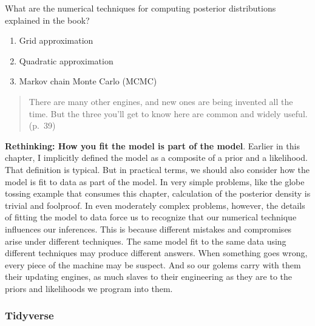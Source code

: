 \documentclass[
  letterpaper,
  DIV=11,
  numbers=noendperiod]{scrreprt}
\providecommand{\tightlist}{%
  \setlength{\itemsep}{0pt}\setlength{\parskip}{0pt}}\usepackage{longtable,booktabs,array}
\begin{document}
What are the numerical techniques for computing posterior distributions
explained in the book?

\begin{enumerate}
\def\labelenumi{\arabic{enumi}.}
\tightlist
\item
  Grid approximation
\item
  Quadratic approximation
\item
  Markov chain Monte Carlo (MCMC)
\end{enumerate}

\begin{quote}
There are many other engines, and new ones are being invented all the
time. But the three you'll get to know here are common and widely
useful. (p.~39)
\end{quote}

\begin{tcolorbox}[enhanced jigsaw, colframe=quarto-callout-tip-color-frame, colback=white, toprule=.15mm, breakable, arc=.35mm, bottomtitle=1mm, colbacktitle=quarto-callout-tip-color!10!white, toptitle=1mm, titlerule=0mm, title=\textcolor{quarto-callout-tip-color}{\faLightbulb}\hspace{0.5em}{Tip}, leftrule=.75mm, opacityback=0, rightrule=.15mm, opacitybacktitle=0.6, bottomrule=.15mm, left=2mm, coltitle=black]

\textbf{Rethinking: How you fit the model is part of the model}. Earlier
in this chapter, I implicitly defined the model as a composite of a
prior and a likelihood. That definition is typical. But in practical
terms, we should also consider how the model is fit to data as part of
the model. In very simple problems, like the globe tossing example that
consumes this chapter, calculation of the posterior density is trivial
and foolproof. In even moderately complex problems, however, the details
of fitting the model to data force us to recognize that our numerical
technique influences our inferences. This is because different mistakes
and compromises arise under different techniques. The same model fit to
the same data using different techniques may produce different answers.
When something goes wrong, every piece of the machine may be suspect.
And so our golems carry with them their updating engines, as much slaves
to their engineering as they are to the priors and likelihoods we
program into them.

\end{tcolorbox}

\hypertarget{tidyverse-5}{%
\subsubsection{Tidyverse}\label{tidyverse-5}}
\end{document}
